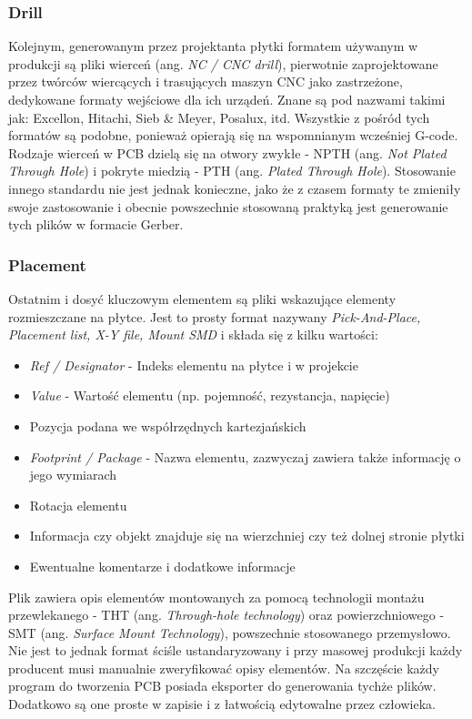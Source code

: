\documentclass[brudnopis]{xmgr}
\begin{document}
\subsubsection {Drill}
Kolejnym, generowanym przez projektanta płytki formatem używanym w produkcji są pliki wierceń (ang. \emph{NC / CNC drill}), pierwotnie zaprojektowane przez twórców wiercących i trasujących maszyn CNC jako zastrzeżone, dedykowane formaty wejściowe dla ich urządeń. Znane są pod nazwami takimi jak: Excellon, Hitachi, Sieb \& Meyer, Posalux, itd.\cite{Charras} Wszystkie z pośród tych formatów są podobne, ponieważ opierają się na wspomnianym wcześniej G-code. Rodzaje wierceń w PCB dzielą się na otwory zwykłe - NPTH (ang. \emph{Not Plated Through Hole}) i pokryte miedzią - PTH (ang. \emph{Plated Through Hole}).\cite{voldman} Stosowanie innego standardu nie jest jednak konieczne, jako że z czasem formaty te zmieniły swoje zastosowanie i obecnie powszechnie stosowaną praktyką jest generowanie tych plików w formacie Gerber.

\subsubsection {Placement}
Ostatnim i dosyć kluczowym elementem są pliki wskazujące elementy rozmieszczane na płytce. Jest to prosty format nazywany \emph {Pick-And-Place, Placement list, X-Y file, Mount SMD}  i składa się z kilku wartości:
\begin{itemize}
\item \emph{Ref / Designator} - Indeks elementu na płytce i w projekcie
\item \emph{Value} - Wartość elementu (np. pojemność, rezystancja, napięcie)
\item Pozycja podana we współrzędnych kartezjańskich
\item \emph{Footprint / Package} - Nazwa elementu, zazwyczaj zawiera także informację o jego wymiarach
\item Rotacja elementu
\item Informacja czy objekt znajduje się na wierzchniej czy też dolnej stronie płytki
\item Ewentualne komentarze i dodatkowe informacje
\end{itemize}
Plik zawiera opis elementów montowanych za pomocą technologii montażu przewlekanego - THT (ang. \emph{Through-hole technology}) oraz powierzchniowego - SMT (ang. \emph{Surface Mount Technology}), powszechnie stosowanego przemysłowo.\cite {prasad} Nie jest to jednak format ściśle ustandaryzowany i przy masowej produkcji każdy producent musi manualnie zweryfikować opisy elementów. Na szczęście każdy program do tworzenia PCB posiada eksporter do generowania tychże plików. Dodatkowo są one proste w zapisie i z łatwością edytowalne przez człowieka.
\end{document}
